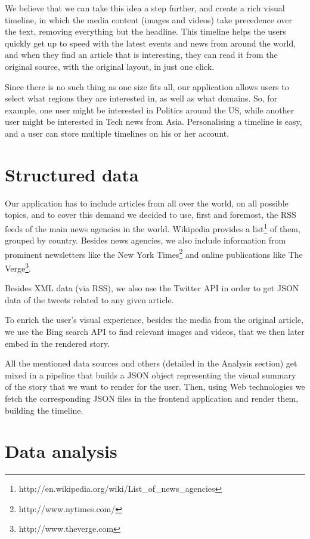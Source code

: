 \documentclass{acm_proc_10ptArticle-sp}
\begin{document}
We believe that we can take this idea a step further, and create a rich visual timeline, in which the media content (images and videos) take precedence over the text, removing everything but the headline. This timeline helps the users quickly get up to speed with the latest events and news from around the world, and when they find an article that is interesting, they can read it from the original source, with the original layout, in just one click.

Since there is no such thing as one size fits all, our application allows users to select what regions they are interested in, as well as what domains. So, for example, one user might be interested in Politics around the US, while another user might be interested in Tech news from Asia. Personalising a timeline is easy, and a user can store multiple timelines on his or her account.

\section{Structured data}

Our application has to include articles from all over the world, on all possible topics, and to cover this demand we decided to use, first and foremost, the RSS feeds of the main news agencies in the world. Wikipedia provides a list\footnote{http://en.wikipedia.org/wiki/List_of_news_agencies} of them, grouped by country. Besides news agencies, we also include information from prominent newsletters like the New York Times\footnote{http://www.nytimes.com/} and online publications like The Verge\footnote{http://www.theverge.com}.

Besides XML data (via RSS), we also use the Twitter API in order to get JSON data of the tweets related to any given article.

To enrich the user’s visual experience, besides the media from the original article, we use the Bing search API to find relevant images and videos, that we then later embed in the rendered story.

All the mentioned data sources and others (detailed in the Analysis section) get mixed in a pipeline that builds a JSON object representing the visual summary of the story that we want to render for the user. Then, using Web technologies we fetch the corresponding JSON files in the frontend application and render them, building the timeline.

\section{Data analysis}
\end{document}

